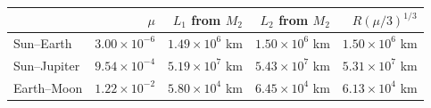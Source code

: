 \documentclass[10pt]{article}
\begin{document}
\begin{center}
\small
\begin{tabular}{lrrrr}
\toprule
 & $\mu$ & $L_1$ from $M_2$ & $L_2$ from $M_2$ & $R(\mu/3)^{1/3}$ \\
\midrule
Sun--Earth   & $3.00\times 10^{-6}$ & $1.49\times 10^6$ km & $1.50\times 10^6$ km & $1.50\times 10^6$ km \\
Sun--Jupiter & $9.54\times 10^{-4}$ & $5.19\times 10^7$ km & $5.43\times 10^7$ km & $5.31\times 10^7$ km \\
Earth--Moon  & $1.22\times 10^{-2}$ & $5.80\times 10^4$ km & $6.45\times 10^4$ km & $6.13\times 10^4$ km \\
\bottomrule
\end{tabular}
\end{center}
\end{document}

